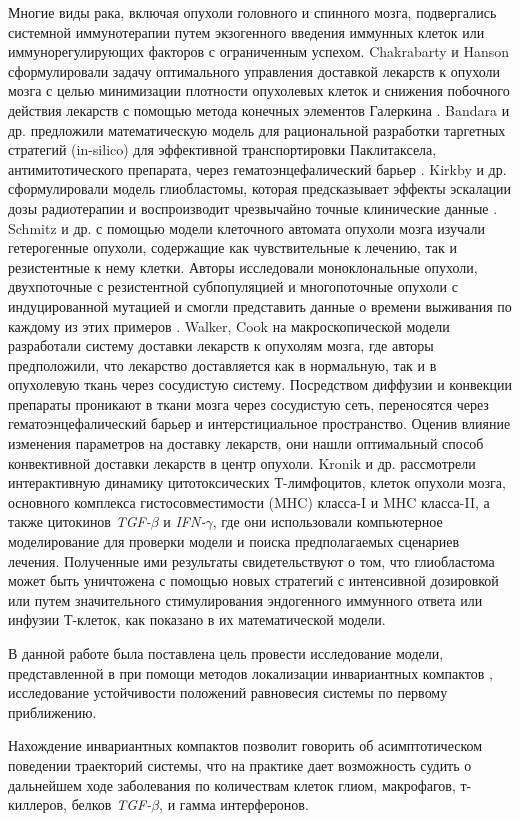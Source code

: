 \documentclass[12pt,a4paper]{extarticle}
\theoremstyle{definition}
\theoremstyle{definition}
\theoremstyle{definition}
\begin{document}
\begin{introduction}
	Многие виды рака, включая опухоли головного и спинного мозга, подвергались системной иммунотерапии путем экзогенного введения иммунных клеток или иммунорегулирующих факторов с ограниченным успехом. Chakrabarty и Hanson сформулировали задачу оптимального управления доставкой лекарств к опухоли мозга с целью минимизации плотности опухолевых клеток и снижения побочного действия лекарств с помощью метода конечных элементов Галеркина \cite{Chakrabarty et.al.}. Bandara и др. предложили математическую модель для рациональной разработки таргетных стратегий (in-silico) для эффективной транспортировки Паклитаксела, антимитотического препарата, через гематоэнцефалический барьер \cite{Bandera}. Kirkby и др. сформулировали модель глиобластомы, которая предсказывает эффекты эскалации дозы радиотерапии и воспроизводит чрезвычайно точные клинические данные \cite{Kirkby et.al.}. Schmitz и др. с помощью модели клеточного автомата опухоли мозга изучали гетерогенные опухоли, содержащие как чувствительные к лечению, так и резистентные к нему клетки. Авторы исследовали моноклональные опухоли, двухпоточные с резистентной субпопуляцией и многопоточные опухоли с индуцированной мутацией и смогли представить данные о времени выживания по каждому из этих примеров \cite{Schmitz et.al.}. Walker, Cook \cite{Walker et.al.} на макроскопической модели разработали систему доставки лекарств к опухолям мозга, где авторы предположили, что лекарство доставляется как в нормальную, так и в опухолевую ткань через сосудистую систему. Посредством диффузии и конвекции препараты проникают в ткани мозга через сосудистую сеть, переносятся через гематоэнцефалический барьер и интерстициальное пространство. Оценив влияние изменения параметров на доставку лекарств, они нашли оптимальный способ конвективной доставки лекарств в центр опухоли. Kronik и др. \cite{Kronik et.al.} рассмотрели интерактивную динамику цитотоксических Т-лимфоцитов, клеток опухоли мозга, основного комплекса гистосовместимости (MHC) класса-I и MHC класса-II, а также цитокинов \textit{TGF-}$\beta$ и \textit{IFN-}$\gamma$, где они использовали компьютерное моделирование для проверки модели и поиска предполагаемых сценариев лечения. Полученные ими результаты свидетельствуют о том, что глиобластома может быть уничтожена с помощью новых стратегий с интенсивной дозировкой или путем значительного стимулирования эндогенного иммунного ответа или инфузии Т-клеток, как показано в их математической модели.
	
	В данной работе была поставлена цель провести исследование модели, представленной в \cite{model} при помощи методов локализации инвариантных компактов \cite{invar_comp, invar_comp_localization}, исследование устойчивости положений равновесия системы по первому приближению.
	
	Нахождение инвариантных компактов позволит говорить об асимптотическом поведении траекторий системы, что на практике дает возможность судить о дальнейшем ходе заболевания по количествам клеток глиом, макрофагов, т-киллеров, белков \textit{TGF-}$\beta$, и гамма интерферонов.
	
	\end{introduction}
	
\end{document}
